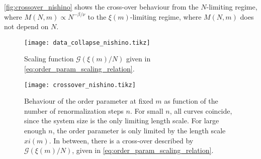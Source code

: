 \autoref{fig:crossover_nishino} shows the cross-over behaviour from the $N$-limiting regime, where
$M(N, m) \propto N^{-\beta/\nu}$ to the $\xi(m)$-limiting regime, where $M(N, m)$ does not depend on $N$.

\begin{figure}
  \texttt{[image: data\_collapse\_nishino.tikz]}
  \caption{Scaling function $\mathcal{G}(\xi(m)/N)$ given in
  \autoref{eq:order_param_scaling_relation}.}\label{fig:data_collapse_nishino}
\end{figure}

\begin{figure}
  \texttt{[image: crossover\_nishino.tikz]}
  \caption{Behaviour of the order parameter at fixed $m$ as function of
  the number of renormalization steps $n$. For small $n$, all curves coincide, since the system size is the only
  limiting length scale. For large enough $n$, the order parameter is only limited by the length scale
  $xi(m)$. In between, there is a cross-over described by $\mathcal{G}(\xi(m)/N)$, given in
  \autoref{eq:order_param_scaling_relation}.}\label{fig:crossover_nishino}
\end{figure}
%



%
